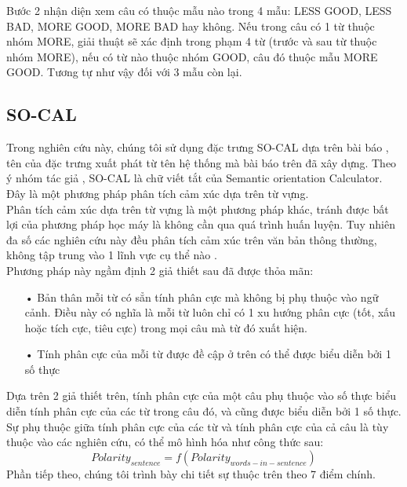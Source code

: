 Bước 2 nhận diện xem câu có thuộc mẫu nào trong 4 mẫu: LESS GOOD, LESS BAD, MORE GOOD, MORE BAD hay không. Nếu trong câu có 1 từ thuộc nhóm MORE, giải thuật sẽ xác định trong phạm 4 từ (trước và sau từ thuộc nhóm MORE), nếu có từ nào thuộc nhóm GOOD, câu đó thuộc mẫu MORE GOOD. Tương tự như vậy đối với 3 mẫu còn lại.
\subsection{SO-CAL}
Trong nghiên cứu này, chúng tôi sử dụng đặc trưng SO-CAL dựa trên bài báo \cite{taboada2011lexicon}, tên của đặc trưng xuất phát từ tên hệ thống mà bài báo trên đã xây dựng. Theo ý nhóm tác giả \cite{taboada2011lexicon}, SO-CAL là chữ viết tắt của Semantic orientation Calculator. Đây là một phương pháp phân tích cảm xúc dựa trên từ vựng.\\

Phân tích cảm xúc dựa trên từ vựng là một phương pháp khác, tránh được bất lợi của phương pháp học máy là không cần qua quá trình huấn luyện. Tuy nhiên đa số các nghiên cứu này đều phân tích cảm xúc trên văn bản thông thường, không tập trung vào 1 lĩnh vực cụ thể nào \cite{taboada2011lexicon}\cite{Zhang2011}\cite{ohana2009sentiment}\cite{Giachanou2016}. \\

Phương pháp này ngầm định 2 giả thiết sau đã được thỏa mãn:
\begin{itemize}
\item[•] Bản thân mỗi từ có sẳn tính phân cực mà không bị phụ thuộc vào ngữ cảnh. Điều này có nghĩa là mỗi từ luôn chỉ có 1 xu hướng phân cực (tốt, xấu hoặc tích cực, tiêu cực) trong mọi câu mà từ đó xuất hiện.
\item[•] Tính phân cực của mỗi từ được đề cập ở trên có thể được biểu diễn bởi 1 số thực
\end{itemize}
Dựa trên 2 giả thiết trên, tính phân cực của một câu phụ thuộc vào số thực biểu diễn tính phân cực của các từ trong câu đó, và cũng được biểu diễn bởi 1 số thực. Sự phụ thuộc giữa tính phân cực của các từ và tính phân cực của cả câu là tùy thuộc vào các nghiên cứu, có thể mô hình hóa như công thức sau:
\begin{equation}
Polarity_{sentence}=f(Polarity_{words-in-sentence})
\end{equation}
Phần tiếp theo, chúng tôi trình bày chi tiết sự thuộc trên theo 7 điểm chính.\\
